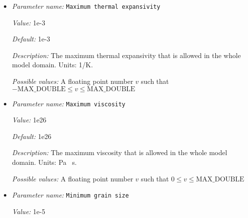 \begin{itemize}
{\it Value:} 100


{\it Default:} 100


{\it Description:} The factor by which viscosity at adiabatic temperature and ambient temperature are allowed to differ (a value of x means that the viscosity can be x times higher or x times lower compared to the value at adiabatic temperature. This parameter is introduced to limit local viscosity contrasts, but still allow for a widely varying viscosity over the whole mantle range. Units: none.


{\it Possible values:} A floating point number $v$ such that $0 \leq v \leq \text{MAX\_DOUBLE}$
\item {\it Parameter name:} {\tt Maximum thermal expansivity}
\label{parameters:Material model/Grain size model/Maximum thermal expansivity}


{\it Value:} 1e-3


{\it Default:} 1e-3


{\it Description:} The maximum thermal expansivity that is allowed in the whole model domain. Units: 1/K.


{\it Possible values:} A floating point number $v$ such that $-\text{MAX\_DOUBLE} \leq v \leq \text{MAX\_DOUBLE}$
\item {\it Parameter name:} {\tt Maximum viscosity}
\label{parameters:Material model/Grain size model/Maximum viscosity}


{\it Value:} 1e26


{\it Default:} 1e26


{\it Description:} The maximum viscosity that is allowed in the whole model domain. Units: Pa \, s.


{\it Possible values:} A floating point number $v$ such that $0 \leq v \leq \text{MAX\_DOUBLE}$
\item {\it Parameter name:} {\tt Minimum grain size}
\label{parameters:Material model/Grain size model/Minimum grain size}


{\it Value:} 1e-5



\end{itemize}
